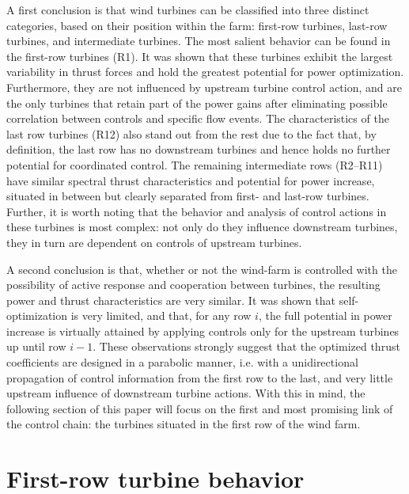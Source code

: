 \documentclass[wes, manuscript]{copernicus}
\begin{document}
A first conclusion is that wind turbines can be classified into three distinct categories, based on their position within the farm: first-row turbines, last-row turbines, and intermediate turbines. The most salient behavior can be found in the first-row turbines (R1). It was shown that these turbines exhibit the largest variability in thrust forces and hold the greatest potential for power optimization. Furthermore, they are not influenced by upstream turbine control action, and are the only turbines that retain part of the power gains after eliminating possible correlation between controls and specific flow events.  
The characteristics of the last row turbines (R12) also stand out from the rest due to the fact that, by definition, the last row has no downstream turbines and hence holds no further potential for coordinated control. 
The remaining intermediate rows (R2--R11) have similar spectral thrust characteristics and potential for power increase, situated in between but clearly separated from first- and last-row turbines. Further, it is worth noting that the behavior and analysis of control actions in these turbines is most complex: not only do they influence downstream turbines, they in turn are dependent on controls of upstream turbines. 

A second conclusion is that, whether or not the wind-farm is controlled with the possibility of active response and cooperation between turbines, the resulting power and thrust characteristics are very similar. It was shown that self-optimization is very limited, and that, for any row $i$, the full potential in power increase is virtually attained by applying controls only for the upstream turbines up until row $i-1$. These observations strongly suggest that the optimized thrust coefficients are designed in a parabolic manner, i.e. with a unidirectional propagation of control information from the first row to the last, and very little upstream influence of downstream turbine actions.
With this in mind, the following section of this paper will focus on the first and most promising link of the control chain: the turbines situated in the first row of the wind farm.

\section{First-row turbine behavior}\label{sec:analysis_flow_vis}
\end{document}
